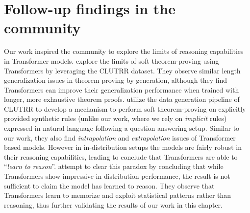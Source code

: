 \documentclass[letterpaper, 12pt]{report}
\begin{document}
\section{Follow-up findings in the community}
\label{sec:clutrr_followup}

Our work inspired the community to explore the limits of reasoning capabilities in Transformer models.
\cite{gontier2020measuring} explore the limits of soft theorem-proving using Transformers by leveraging the CLUTRR dataset. They observe similar length generalization issues in theorem proving by generation, although they find Transformers can improve their generalization performance when trained with longer, more exhaustive theorem proofs.
\cite{Clark2020TransformersAS} utilize the data generation pipeline of CLUTRR to develop a mechanism to perform soft theorem-proving on explicitly provided synthetic rules (unlike our work, where we rely on \textit{implicit} rules) expressed in natural language following a question answering setup. Similar to our work, they also find \textit{intrapolation} and \textit{extrapolation} issues of Transformer based models. However in in-distribution setups the models are fairly robust in their reasoning capabilities, leading \cite{Clark2020TransformersAS} to conclude that Transformers are able to ``\textit{learn to reason}''.
\cite{Zhang2022OnTP} attempt to clear this paradox by concluding that while Transformers show impressive in-distribution performance, the result is not sufficient to claim the model has learned to reason. They observe that Transformers learn to memorize and exploit statistical patterns rather than reasoning, thus further validating the results of our work in this chapter.
\end{document}
